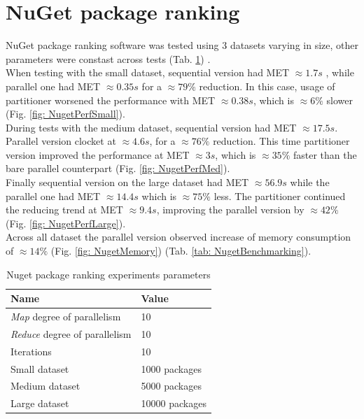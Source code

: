 \section{NuGet package ranking}
NuGet package ranking software was tested using 3 datasets varying in size, 
other parameters were constast across tests (Tab. \ref{tab: NuGetParameters})
. \\
When testing with the small dataset, sequential version had MET $\approx 1.7s$
, while parallel one had MET $\approx 0.35s$ for a $\approx 79\%$ reduction. 
In this case, usage of partitioner worsened the performance with MET  $\approx
 0.38s$, which is $\approx 6\%$ slower (Fig. \ref{fig: NugetPerfSmall}). \\ 
During tests with the medium dataset, sequential version had MET $\approx 17.5
s$. Parallel version clocket at $\approx 4.6s$, for a $\approx 76\%$ 
reduction. This time partitioner version improved the performance at MET $
\approx 3s$, which is $\approx 35\%$ faster than the bare parallel 
counterpart (Fig. \ref{fig: NugetPerfMed}). \\ 
Finally sequential version on the large dataset had MET $\approx 56.9s$ while 
the parallel one had MET $\approx 14.4s$ which is $\approx 75\%$ less.
The partitioner continued the reducing trend at MET $\approx 9.4s$, improving 
the parallel version by $\approx 42 \%$ (Fig. \ref{fig: NugetPerfLarge}). \\
Across all dataset the parallel version observed increase of memory 
consumption of $\approx 14\%$ (Fig. \ref{fig: NugetMemory}) (Tab. \ref{tab: NugetBenchmarking}).

\begin{table}[!ht]
    \centering
    \caption{Nuget package ranking experiments parameters}
		\label{tab: NuGetParameters}
    \begin{tabular}{p{5cm}p{3cm}}
			\toprule
			\bfseries Name 	&
			\bfseries Value \\
			\midrule
			\emph{Map} degree of parallelism & 10 \\
			\emph{Reduce} degree of parallelism & 10 \\
			Iterations & 10 \\ 
			Small dataset  & 1000 packages  \\	
			Medium dataset  & 5000 packages  \\	
			Large dataset  & 10000 packages  \\	
			\bottomrule
    \end{tabular}
\end{table}

